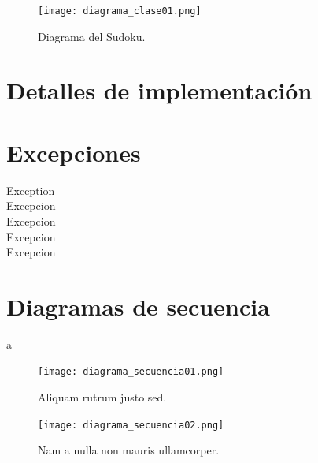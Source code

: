 \documentclass[titlepage,a4paper]{article}
\begin{document}
\begin{figure}[H]
\centering
\texttt{[image: diagrama\_clase01.png]}
\caption{\label{fig:class01}Diagrama del Sudoku.}
\end{figure}

\section{Detalles de implementación}\label{sec:implementacion}




\section{Excepciones}\label{sec:excepciones}

\begin{description}
\item[Exception]
\item[Excepcion] 
\item[Excepcion] 
\item[Excepcion] 
\item[Excepcion] 
\end{description}

\section{Diagramas de secuencia}\label{sec:diagramasdesecuencia}

a

\begin{figure}[H]
\centering
\texttt{[image: diagrama\_secuencia01.png]}
\caption{\label{fig:seq01}Aliquam rutrum justo sed.}
\end{figure}

\begin{figure}[H]
\centering
\texttt{[image: diagrama\_secuencia02.png]}
\caption{\label{fig:seq02}Nam a nulla non mauris ullamcorper.}
\end{figure}
\end{document}
